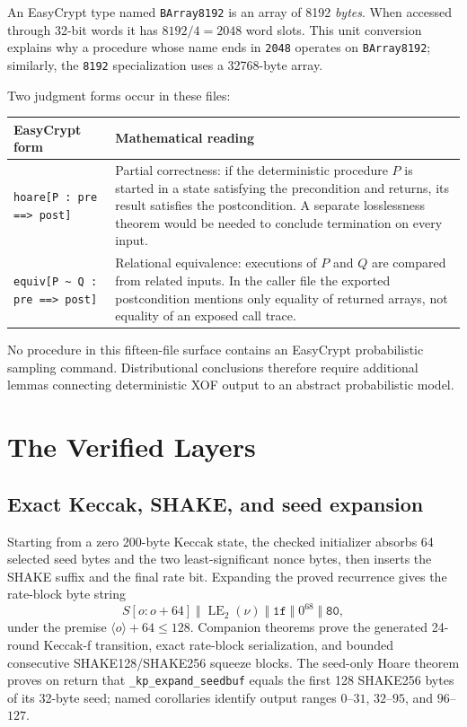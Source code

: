 \documentclass[11pt]{article}
\theoremstyle{definition}
\theoremstyle{plain}
\theoremstyle{remark}
\newcommand{\code}[1]{\nolinkurl{#1}}
\newcommand{\uint}[1]{\langle #1\rangle}
\begin{document}
An EasyCrypt type named \code{BArray8192} is an array of 8192 \emph{bytes}.
When accessed through 32-bit words it has $8192/4=2048$ word slots.  This unit
conversion explains why a procedure whose name ends in \code{2048} operates
on \code{BArray8192}; similarly, the \code{8192} specialization uses a
32768-byte array.

Two judgment forms occur in these files:

\begin{center}
\begin{tabularx}{\textwidth}{>{\raggedright\arraybackslash}p{}X}
\toprule
EasyCrypt form & Mathematical reading \\
\midrule
\code{hoare[P : pre ==> post]} &
Partial correctness: if the deterministic procedure $P$ is started in a state
satisfying the precondition and returns, its result satisfies the
postcondition.  A separate losslessness theorem would be needed to conclude
termination on every input. \\
\code{equiv[P ~ Q : pre ==> post]} &
Relational equivalence: executions of $P$ and $Q$ are compared from related
inputs.  In the caller file the exported postcondition mentions only equality
of returned arrays, not equality of an exposed call trace. \\
\bottomrule
\end{tabularx}
\end{center}

No procedure in this fifteen-file surface contains an EasyCrypt probabilistic
sampling command.  Distributional conclusions therefore require additional
lemmas connecting deterministic XOF output to an abstract probabilistic model.

\section{The Verified Layers}

\subsection{Exact Keccak, SHAKE, and seed expansion}

Starting from a zero 200-byte Keccak state, the checked initializer absorbs
64 selected seed bytes and the two least-significant nonce bytes, then inserts
the SHAKE suffix and the final rate bit.  Expanding the proved recurrence gives
the rate-block byte string
\[
  S[o:o+64]\;\Vert\;\operatorname{LE}_2(\nu)\;\Vert\;
  \mathtt{1f}\;\Vert\;0^{68}\;\Vert\;\mathtt{80},
\]
under the premise $\uint o+64\le128$.  Companion theorems prove the generated
24-round Keccak-f transition, exact rate-block serialization, and bounded
consecutive SHAKE128/SHAKE256 squeeze blocks.  The seed-only Hoare theorem
proves on return that \code{_kp_expand_seedbuf} equals the first 128 SHAKE256
bytes of its 32-byte seed; named corollaries identify output ranges $0$--$31$,
$32$--$95$, and $96$--$127$.
\end{document}
